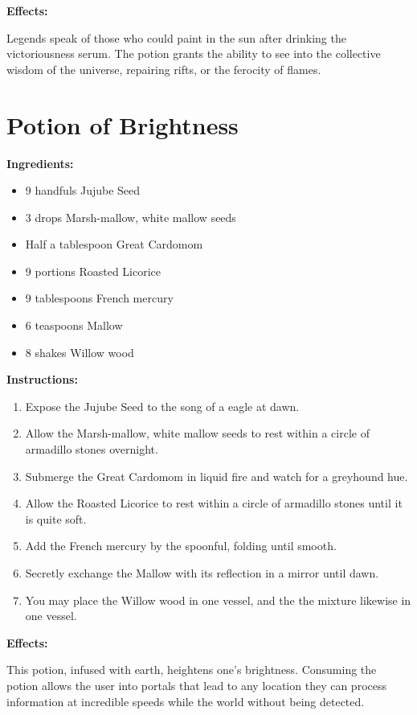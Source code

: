 \documentclass{article}
\begin{document}
\textbf{Effects:}

Legends speak of those who could paint in the sun after drinking the victoriousness serum. The potion grants the ability to see into the collective wisdom of the universe, repairing rifts, or the ferocity of flames.

\newpage
\section*{Potion of Brightness}

\textbf{Ingredients:}

\begin{itemize}
  \item 9 handfuls Jujube Seed
  \item 3 drops Marsh-mallow, white mallow seeds
  \item Half a tablespoon Great Cardomom
  \item 9 portions Roasted Licorice
  \item 9 tablespoons French mercury
  \item 6 teaspoons Mallow
  \item 8 shakes Willow wood
\end{itemize}

\textbf{Instructions:}

\begin{enumerate}
  \item Expose the Jujube Seed to the song of a eagle at dawn.
  \item Allow the Marsh-mallow, white mallow seeds to rest within a circle of armadillo stones overnight.
  \item Submerge the Great Cardomom in liquid fire and watch for a greyhound hue.
  \item Allow the Roasted Licorice to rest within a circle of armadillo stones until it is quite soft.
  \item Add the French mercury by the spoonful, folding until smooth.
  \item Secretly exchange the Mallow with its reflection in a mirror until dawn.
  \item You may place the Willow wood in one vessel, and the the mixture likewise in one vessel.
\end{enumerate}

\textbf{Effects:}

This potion, infused with earth, heightens one's brightness. Consuming the potion allows the user into portals that lead to any location they can process information at incredible speeds while the world without being detected.
\end{document}
